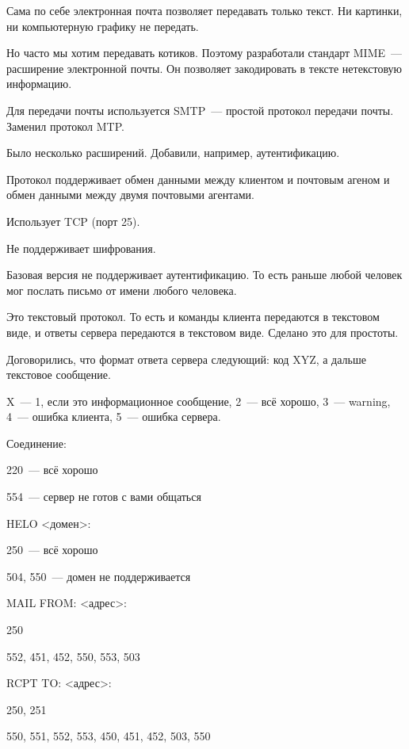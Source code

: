 Сама по себе электронная почта позволяет передавать только текст. Ни картинки, ни компьютерную графику не передать.

Но часто мы хотим передавать котиков. Поэтому разработали стандарт MIME~--- расширение электронной почты. Он позволяет закодировать в тексте нетекстовую информацию.


Для передачи почты используется SMTP~--- простой протокол передачи почты. Заменил протокол MTP.

Было несколько расширений. Добавили, например, аутентификацию. 

Протокол поддерживает обмен данными между клиентом и почтовым агеном и обмен данными между двумя почтовыми агентами.

Использует TCP (порт 25).

Не поддерживает шифрования.

Базовая версия не поддерживает аутентификацию. То есть раньше любой человек мог послать письмо от имени любого человека.

Это текстовый протокол. То есть и команды клиента передаются в текстовом виде, и ответы сервера передаются в текстовом виде. Сделано это для простоты.

Договорились, что формат ответа сервера следующий: код XYZ, а дальше текстовое сообщение.

X~--- 1, если это информационное сообщение, 2~--- всё хорошо, 3~--- warning, 4~--- ошибка клиента, 5~--- ошибка сервера.

Соединение:
\begin{MyItemize}
    \item 220~--- всё хорошо
    \item 554~--- сервер не готов с вами общаться
\end{MyItemize}

HELO <домен>:
\begin{MyItemize}
    \item 250~--- всё хорошо
    \item 504, 550~--- домен не поддерживается
\end{MyItemize}

MAIL FROM: <адрес>:
\begin{MyItemize}
    \item 250
    \item 552, 451, 452, 550, 553, 503
\end{MyItemize}

RCPT TO: <адрес>:
\begin{MyItemize}
    \item 250, 251
    \item 550, 551, 552, 553, 450, 451, 452, 503, 550
\end{MyItemize}


